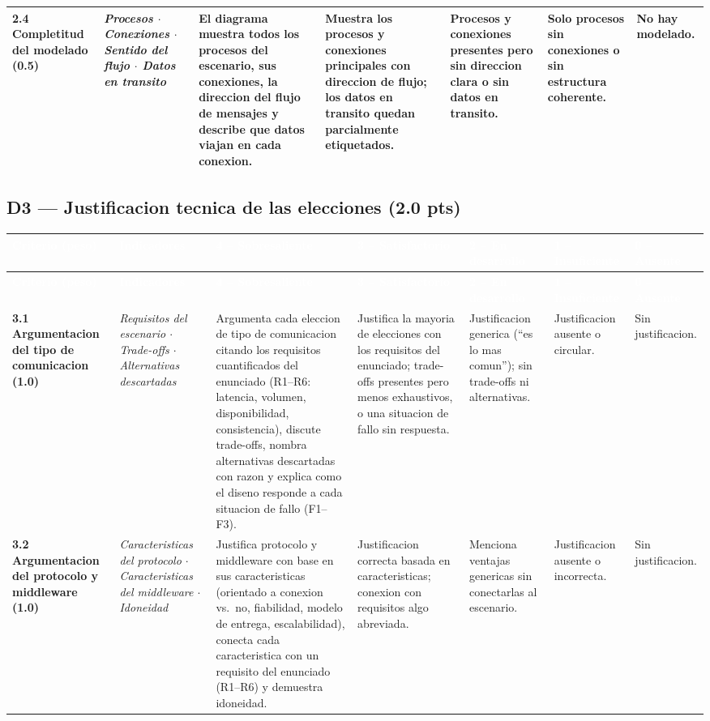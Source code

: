 \documentclass[10pt]{article}
\newcommand{\rubheader}{\rowcolor{uteqBlue}\textbf{\textcolor{white}{Criterio (peso)}} & \textbf{\textcolor{white}{Indicadores}} & \textbf{\textcolor{white}{4 -- Sobresaliente}} & \textbf{\textcolor{white}{3 -- Satisfactorio}} & \textbf{\textcolor{white}{2 -- En desarrollo}} & \textbf{\textcolor{white}{1 -- Insuficiente}} & \textbf{\textcolor{white}{0 -- Ausente}}\\\hline}
\begin{document}
\begin{xltabular}{\textwidth}{|>{\RaggedRight\small}p{2.7cm}|>{\RaggedRight\small}p{2.8cm}|>{\RaggedRight\small}X|>{\RaggedRight\small}X|>{\RaggedRight\small}X|>{\RaggedRight\small}X|>{\RaggedRight\small}X|}
	\hline
	\textbf{2.4 Completitud del modelado (0.5)} & \textit{Procesos $\cdot$ Conexiones $\cdot$ Sentido del flujo $\cdot$ Datos en transito} & El diagrama muestra todos los procesos del escenario, sus conexiones, la direccion del flujo de mensajes y describe que datos viajan en cada conexion. & Muestra los procesos y conexiones principales con direccion de flujo; los datos en transito quedan parcialmente etiquetados. & Procesos y conexiones presentes pero sin direccion clara o sin datos en transito. & Solo procesos sin conexiones o sin estructura coherente. & No hay modelado.\\
	\hline
\end{xltabular}

\subsection{D3 --- Justificacion tecnica de las elecciones (2.0 pts)}

\begin{xltabular}{\textwidth}{|>{\RaggedRight\small}p{2.7cm}|>{\RaggedRight\small}p{2.8cm}|>{\RaggedRight\small}X|>{\RaggedRight\small}X|>{\RaggedRight\small}X|>{\RaggedRight\small}X|>{\RaggedRight\small}X|}
	\hline
	\rubheader
	\endfirsthead
	\hline
	\rubheader
	\endhead
	\textbf{3.1 Argumentacion del tipo de comunicacion (1.0)} & \textit{Requisitos del escenario $\cdot$ Trade-offs $\cdot$ Alternativas descartadas} & Argumenta cada eleccion de tipo de comunicacion citando los requisitos cuantificados del enunciado (R1--R6: latencia, volumen, disponibilidad, consistencia), discute trade-offs, nombra alternativas descartadas con razon y explica como el diseno responde a cada situacion de fallo (F1--F3). & Justifica la mayoria de elecciones con los requisitos del enunciado; trade-offs presentes pero menos exhaustivos, o una situacion de fallo sin respuesta. & Justificacion generica (``es lo mas comun''); sin trade-offs ni alternativas. & Justificacion ausente o circular. & Sin justificacion.\\
	\hline
	\textbf{3.2 Argumentacion del protocolo y middleware (1.0)} & \textit{Caracteristicas del protocolo $\cdot$ Caracteristicas del middleware $\cdot$ Idoneidad} & Justifica protocolo y middleware con base en sus caracteristicas (orientado a conexion vs.\ no, fiabilidad, modelo de entrega, escalabilidad), conecta cada caracteristica con un requisito del enunciado (R1--R6) y demuestra idoneidad. & Justificacion correcta basada en caracteristicas; conexion con requisitos algo abreviada. & Menciona ventajas genericas sin conectarlas al escenario. & Justificacion ausente o incorrecta. & Sin justificacion.\\
	\hline
\end{xltabular}
\end{document}
